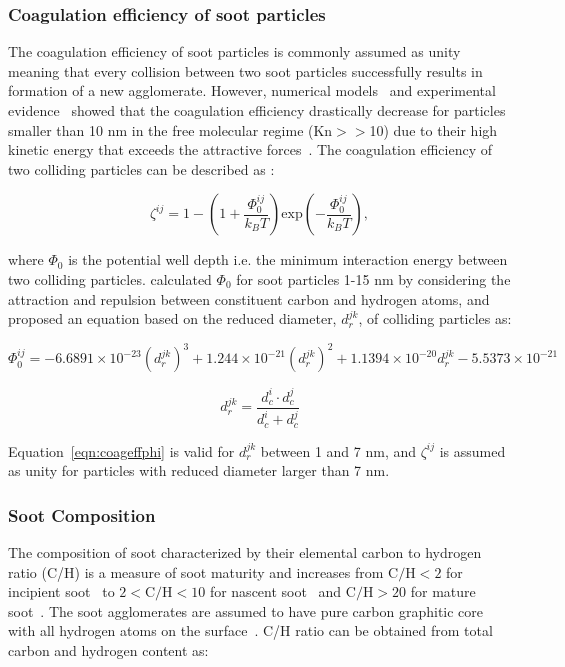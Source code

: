\subsubsection{Coagulation efficiency of soot particles}
\label{sec:coageff}

The coagulation efficiency of soot particles is commonly assumed as unity meaning that every collision between two soot particles successfully results in formation of a new agglomerate. However, numerical models~\citep{narsimhan1985brownian} and experimental evidence~\citep{d2005surface} showed that the coagulation efficiency drastically decrease for particles smaller than 10 nm in the free molecular regime (Kn$>>$10) due to their high kinetic energy that exceeds the attractive forces~\citep{wang1991filtration}. The coagulation efficiency of two colliding particles can be described as \cite{narsimhan1985brownian}:

\begin{equation}
	\zeta^{ij} = 1 - 
	\left(1 + \frac{\Phi^{ij}_0}{k_BT} \right)
	\mathrm{exp}\left(-\frac{\Phi^{ij}_0}{k_BT}\right),
	\label{eqn:coageff}
\end{equation}

   \noindent where $\Phi_0$ is the potential well depth i.e. the minimum interaction energy between two colliding particles. \citet{hou2020coagulation} calculated $\Phi_0$ for soot particles 1-15 nm by considering the attraction and repulsion between constituent carbon and hydrogen atoms, and proposed an equation based on the reduced diameter, $d^{jk}_r$, of colliding particles as:

\begin{equation}
	\Phi^{ij}_0 = -6.6891\times10^{-23} (d^{jk}_r)^3 + 1.244\times10^{-21} (d^{jk}_r)^2 + 1.1394\times10^{-20} d^{jk}_r - 5.5373\times10^{-21}
	\label{eqn:coageffphi}
\end{equation}

\begin{equation}
	d^{jk}_r = \frac{d^i_c\cdot d^j_c}{d^i_c+d^j_c}
	\label{eqn:coageffredcueddia}
\end{equation}

 Equation~\eqref{eqn:coageffphi} is valid for $d^{jk}_r$ between 1 and 7 nm, and $\zeta^{ij}$ is assumed as unity for particles with reduced diameter larger than 7 nm.

\subsubsection{Soot Composition}
The composition of soot characterized by their elemental carbon to hydrogen ratio (C/H) is a measure of soot maturity and increases from $\mathrm{C/H<2}$ for incipient soot~\citep{ciajolo1998spectroscopic} to $\mathrm{2<C/H<10}$ for nascent soot~\citep{betrancourt2017investigation} and $\mathrm{C/H>20}$ for mature soot~\citep{michelsen2017probing}. The soot agglomerates are assumed to have pure carbon graphitic core~\citep{kholghy2016core} with all hydrogen atoms on the surface~\citep{blanquart2009analyzing}. C/H ratio can be obtained from total carbon and hydrogen content as:

